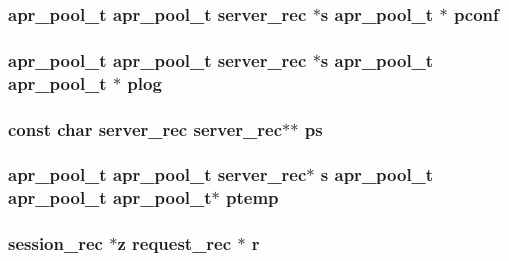 \subsubsection[{\texorpdfstring{pconf}{pconf}}]{ {\bf apr\+\_\+pool\+\_\+t} {\bf apr\+\_\+pool\+\_\+t} {\bf server\+\_\+rec} $\ast${\bf s} {\bf apr\+\_\+pool\+\_\+t} $\ast$ pconf}\hypertarget{group__APACHE__CORE__CONFIG_gade454c9a3dc13ac389d15bf30f6c92b2}{}\label{group__APACHE__CORE__CONFIG_gade454c9a3dc13ac389d15bf30f6c92b2}
\subsubsection[{\texorpdfstring{plog}{plog}}]{ {\bf apr\+\_\+pool\+\_\+t} {\bf apr\+\_\+pool\+\_\+t} {\bf server\+\_\+rec} $\ast${\bf s} {\bf apr\+\_\+pool\+\_\+t} {\bf apr\+\_\+pool\+\_\+t} $\ast$ plog}\hypertarget{group__APACHE__CORE__CONFIG_gaa034d01ac4c0f083d21feaeae4e9c860}{}\label{group__APACHE__CORE__CONFIG_gaa034d01ac4c0f083d21feaeae4e9c860}
\subsubsection[{\texorpdfstring{ps}{ps}}]{\setlength{\rightskip}{0pt plus 5cm}const char {\bf server\+\_\+rec} {\bf server\+\_\+rec}$\ast$$\ast$ ps}\hypertarget{group__APACHE__CORE__CONFIG_gac3433ab45961daa0aed079830e52d54b}{}\label{group__APACHE__CORE__CONFIG_gac3433ab45961daa0aed079830e52d54b}
\subsubsection[{\texorpdfstring{ptemp}{ptemp}}]{ {\bf apr\+\_\+pool\+\_\+t} {\bf apr\+\_\+pool\+\_\+t} {\bf server\+\_\+rec}$\ast$ {\bf s} {\bf apr\+\_\+pool\+\_\+t} {\bf apr\+\_\+pool\+\_\+t} {\bf apr\+\_\+pool\+\_\+t}$\ast$ ptemp}\hypertarget{group__APACHE__CORE__CONFIG_ga276c3069e6bb618213a277e21f6f269e}{}\label{group__APACHE__CORE__CONFIG_ga276c3069e6bb618213a277e21f6f269e}
\subsubsection[{\texorpdfstring{r}{r}}]{ {\bf session\+\_\+rec} $\ast$z {\bf request\+\_\+rec} $\ast$ r}\hypertarget{group__APACHE__CORE__CONFIG_ga091cdd45984e865a888a4f8bb8fe107a}{}\label{group__APACHE__CORE__CONFIG_ga091cdd45984e865a888a4f8bb8fe107a}
